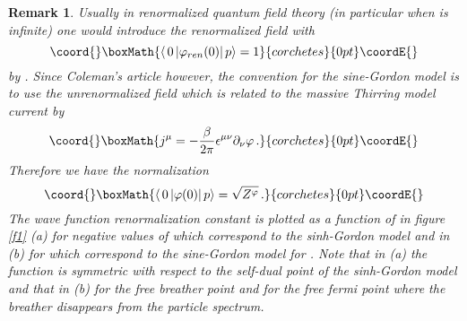 \documentclass[a4paper,a4paper]{article}
\newtheorem{remark}[theorem]{Remark}
\begin{document}
\begin{remark}
Usually in renormalized quantum field theory (in particular when \coordHE{} is
infinite) one would introduce the renormalized field with 
\[\coord{}\boxMath{
\left\langle \,0\left| \varphi _{ren}(0)\right| p\right\rangle =1 
}{corchetes}{0pt}\coordE{}\]
by \coordHE{}. Since Coleman's
article \cite{Co} however, the convention for the sine-Gordon model is to
use the unrenormalized field \coordHE{} which is related to the massive
Thirring model current by 
\[\coord{}\boxMath{
j^{\mu }=-\frac{\beta }{2\pi }\epsilon ^{\mu \nu }\partial _{\nu }\varphi
\,. 
}{corchetes}{0pt}\coordE{}\]
Therefore we have the normalization 
\[\coord{}\boxMath{
\left\langle \,0\left| \varphi (0)\right| p\right\rangle =\sqrt{Z^{\varphi }}%
\,. 
}{corchetes}{0pt}\coordE{}\]
The wave function renormalization constant \coordHE{} is plotted as a
function of \myHighlight{$\nu $}\coordHE{} in figure \ref{f1} (a) for negative values of \myHighlight{$\nu $}\coordHE{}
which correspond to the sinh-Gordon model and in (b) for \coordHE{}
which correspond to the sine-Gordon model for \coordHE{}.
Note that in (a) the function is symmetric with respect to the self-dual
point \coordHE{} of the sinh-Gordon model and that in (b) \coordHE{}
for the free breather point \coordHE{} and \coordHE{} for the free fermi
point \coordHE{} where the breather disappears from the particle spectrum.
\end{remark}
\end{document}

